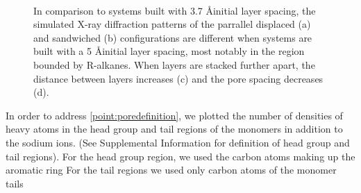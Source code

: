 \documentclass{article}
\begin{document}
\begin{figure}
\begin{subfigure}{0.45\linewidth}
                \caption{}~\label{fig:p2p_disordered}
        \end{subfigure}
	\caption{In comparison to systems built with 3.7 \AA initial layer spacing,  
                the simulated X-ray diffraction patterns of the parrallel displaced (a) and 
 		sandwiched (b) configurations are different when systems are built with 
 		a 5 \AA initial layer spacing, most notably in the region bounded by R-alkanes.
      		When layers are stacked further apart, the distance between layers increases (c)
                and the pore spacing decreases (d).}
  \end{figure}

  In order to address \ref{point:poredefinition}, we plotted the number of
  densities of heavy atoms in the head group and tail regions of the monomers in
  addition to the sodium ions. (See Supplemental Information for definition of
  head group and tail regions). For the head group region, we used the carbon
  atoms making up the aromatic ring For the tail regions we used only carbon
  atoms of the monomer tails
\end{document}
